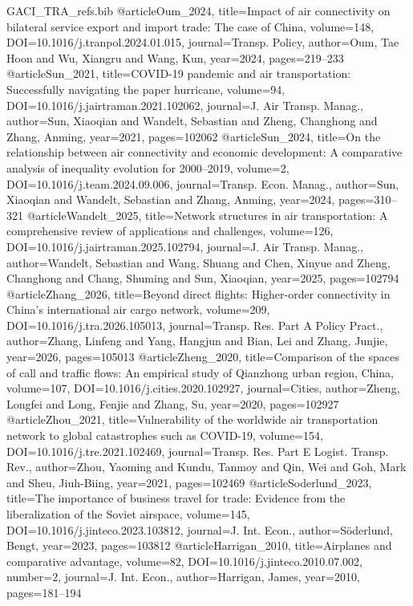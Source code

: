 \begin{filecontents*}[overwrite]{GACI_TRA_refs.bib}
@article{Oum_2024, title={Impact of air connectivity on bilateral service export and import trade: The case of {China}}, volume={148}, DOI={10.1016/j.tranpol.2024.01.015}, journal={Transp. Policy}, author={Oum, Tae Hoon and Wu, Xiangru and Wang, Kun}, year={2024}, pages={219--233} }
@article{Sun_2021, title={{COVID-19} pandemic and air transportation: Successfully navigating the paper hurricane}, volume={94}, DOI={10.1016/j.jairtraman.2021.102062}, journal={J. Air Transp. Manag.}, author={Sun, Xiaoqian and Wandelt, Sebastian and Zheng, Changhong and Zhang, Anming}, year={2021}, pages={102062} }
@article{Sun_2024, title={On the relationship between air connectivity and economic development: A comparative analysis of inequality evolution for 2000--2019}, volume={2}, DOI={10.1016/j.team.2024.09.006}, journal={Transp. Econ. Manag.}, author={Sun, Xiaoqian and Wandelt, Sebastian and Zhang, Anming}, year={2024}, pages={310--321} }
@article{Wandelt_2025, title={Network structures in air transportation: A comprehensive review of applications and challenges}, volume={126}, DOI={10.1016/j.jairtraman.2025.102794}, journal={J. Air Transp. Manag.}, author={Wandelt, Sebastian and Wang, Shuang and Chen, Xinyue and Zheng, Changhong and Chang, Shuming and Sun, Xiaoqian}, year={2025}, pages={102794} }
@article{Zhang_2026, title={Beyond direct flights: Higher-order connectivity in {China}'s international air cargo network}, volume={209}, DOI={10.1016/j.tra.2026.105013}, journal={Transp. Res. Part A Policy Pract.}, author={Zhang, Linfeng and Yang, Hangjun and Bian, Lei and Zhang, Junjie}, year={2026}, pages={105013} }
@article{Zheng_2020, title={Comparison of the spaces of call and traffic flows: An empirical study of {Qianzhong} urban region, {China}}, volume={107}, DOI={10.1016/j.cities.2020.102927}, journal={Cities}, author={Zheng, Longfei and Long, Fenjie and Zhang, Su}, year={2020}, pages={102927} }
@article{Zhou_2021, title={Vulnerability of the worldwide air transportation network to global catastrophes such as {COVID-19}}, volume={154}, DOI={10.1016/j.tre.2021.102469}, journal={Transp. Res. Part E Logist. Transp. Rev.}, author={Zhou, Yaoming and Kundu, Tanmoy and Qin, Wei and Goh, Mark and Sheu, Jiuh-Biing}, year={2021}, pages={102469} }
@article{Soderlund_2023, title={The importance of business travel for trade: Evidence from the liberalization of the {Soviet} airspace}, volume={145}, DOI={10.1016/j.jinteco.2023.103812}, journal={J. Int. Econ.}, author={S\"oderlund, Bengt}, year={2023}, pages={103812} }
@article{Harrigan_2010, title={Airplanes and comparative advantage}, volume={82}, DOI={10.1016/j.jinteco.2010.07.002}, number={2}, journal={J. Int. Econ.}, author={Harrigan, James}, year={2010}, pages={181--194} }

\end{filecontents*}
